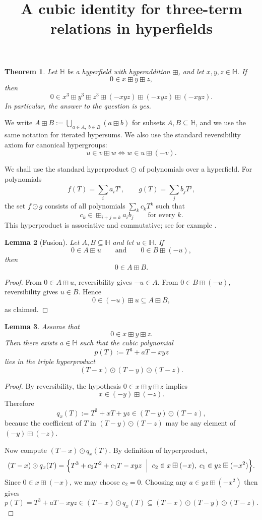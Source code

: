 \documentclass[11pt]{article}
\newtheorem{theorem}{Theorem}
\newtheorem{lemma}[theorem]{Lemma}
\begin{document}
\title{A cubic identity for three-term relations in hyperfields}
\author{}
\date{}
\maketitle

\begin{theorem}\label{thm:main}
Let $\mathbb H$ be a hyperfield with hyperaddition $\boxplus$, and let
$x,y,z\in \mathbb H$.  If
\[
0\in x\boxplus y\boxplus z,
\]
then
\[
0\in x^3\boxplus y^3\boxplus z^3\boxplus (-xyz)\boxplus (-xyz)\boxplus (-xyz).
\]
In particular, the answer to the question is \emph{yes}.
\end{theorem}

\medskip

We write $A\boxplus B:=\bigcup_{a\in A,\; b\in B}(a\boxplus b)$ for subsets
$A,B\subseteq \mathbb H$, and we use the same notation for iterated hypersums.
We also use the standard reversibility axiom for canonical hypergroups:
\[
u\in v\boxplus w \iff w\in u\boxplus (-v).
\]

We shall use the standard hyperproduct $\odot$ of polynomials over a hyperfield.
For polynomials
\[
f(T)=\sum_i a_iT^i,\qquad g(T)=\sum_j b_jT^j,
\]
the set $f\odot g$ consists of all polynomials $\sum_k c_kT^k$ such that
\[
c_k\in \boxplus_{i+j=k} a_ib_j
\qquad\text{for every }k.
\]
This hyperproduct is associative and commutative; see for example
\cite[Section~4]{Jun}.

\begin{lemma}[Fusion]\label{lem:fusion}
Let $A,B\subseteq \mathbb H$ and let $u\in \mathbb H$. If
\[
0\in A\boxplus u
\qquad\text{and}\qquad
0\in B\boxplus (-u),
\]
then
\[
0\in A\boxplus B.
\]
\end{lemma}

\begin{proof}
From $0\in A\boxplus u$, reversibility gives $-u\in A$.
From $0\in B\boxplus (-u)$, reversibility gives $u\in B$.
Hence
\[
0\in (-u)\boxplus u \subseteq A\boxplus B,
\]
as claimed.
\end{proof}

\begin{lemma}\label{lem:cubic-factor}
Assume that
\[
0\in x\boxplus y\boxplus z.
\]
Then there exists $a\in \mathbb H$ such that the cubic polynomial
\[
p(T):=T^3+aT-xyz
\]
lies in the triple hyperproduct
\[
(T-x)\odot (T-y)\odot (T-z).
\]
\end{lemma}

\begin{proof}
By reversibility, the hypothesis $0\in x\boxplus y\boxplus z$ implies
\[
x\in (-y)\boxplus (-z).
\]
Therefore
\[
q_x(T):=T^2+xT+yz \in (T-y)\odot (T-z),
\]
because the coefficient of $T$ in $(T-y)\odot (T-z)$ may be any element of
$(-y)\boxplus (-z)$.

Now compute $(T-x)\odot q_x(T)$. By definition of hyperproduct,
\[
(T-x)\odot q_x(T)
=
\Bigl\{
T^3+c_2T^2+c_1T-xyz
\;\Bigm|\;
c_2\in x\boxplus(-x),\;
c_1\in yz\boxplus(-x^2)
\Bigr\}.
\]
Since $0\in x\boxplus (-x)$, we may choose $c_2=0$. Choosing any
$a\in yz\boxplus (-x^2)$ then gives
\[
p(T)=T^3+aT-xyz \in (T-x)\odot q_x(T)
\subseteq (T-x)\odot (T-y)\odot (T-z).
\]
\end{proof}
\end{document}
